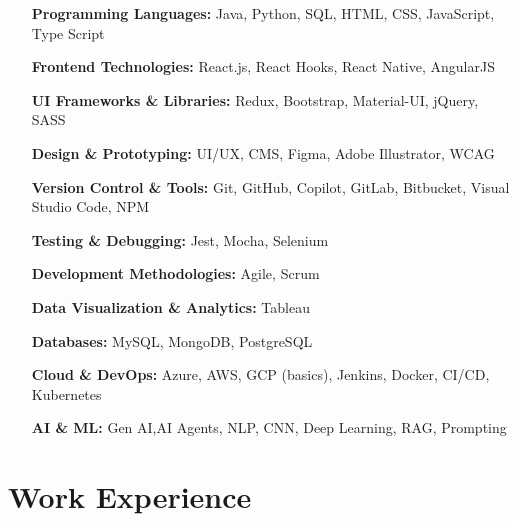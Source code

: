\documentclass[letterpaper,10pt]{article}
\begin{document}
 \begin{singlecol} 
 \begin{itemize}[itemsep=-0.5px, parsep=1pt, leftmargin=150pt] 
 \item[\textbf{Programming Languages:}] Java, Python, SQL, HTML, CSS, JavaScript, Type Script
 \item[\textbf{Frontend Technologies:}] React.js, React Hooks, React Native, AngularJS \item[\textbf{UI Frameworks \& Libraries:}] Redux, Bootstrap, Material-UI, jQuery, SASS 
 \item[\textbf{Design \& Prototyping:}] UI/UX, CMS, Figma, Adobe Illustrator, WCAG
 \item[\textbf{Version Control \& Tools:}] Git, GitHub, Copilot, GitLab, Bitbucket, Visual Studio Code, NPM 
 \item[\textbf{Testing \& Debugging:}] Jest, Mocha, Selenium \item[\textbf{Development Methodologies:}] Agile, Scrum
 \item [\textbf{Data Visualization \& Analytics:}] Tableau 
 \item[\textbf{Databases:}] MySQL, MongoDB, PostgreSQL 
 \item[\textbf{Cloud \& DevOps:}] Azure, AWS, GCP (basics), Jenkins, Docker, CI/CD, Kubernetes
 \item[\textbf{AI \& ML:}] Gen AI,AI Agents, NLP, CNN, Deep Learning, RAG, Prompting
  
 \end{itemize} 
 \end{singlecol}
      

\section{ Work Experience}
\end{document}
